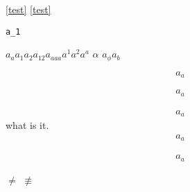 \documentclass{ctexbook}
\begin{document}
\label{test}
\ref{test}
\eqref{test}

\verb|a_1|

\(a_a a_1 a_2 a_{12} a_{aaa} a^1 a^2 a^a \)
\(\alpha\)
\(a_\phi a_b\)

\begin{equation}\label{equ:1}
  a_a
\end{equation}

\begin{align}
  a_a
\end{align}

\begin{equation}
  \begin{aligned}
    a_a
  \end{aligned}
\end{equation}
what is it.
\begin{gather}
  a_a
\end{gather}

\begin{align*}
  a_a
\end{align*}

\(\not=\)
\(\not \equiv\)
\end{document}
